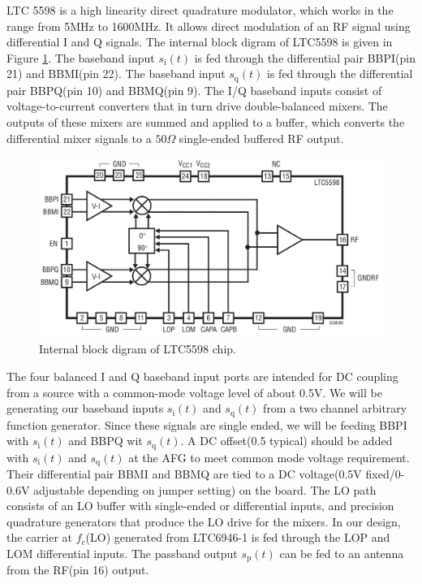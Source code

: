 \documentclass[a4paper,10pt]{article}
\begin{document}
LTC 5598\cite{bib:modchip}
is a high linearity direct quadrature modulator, which works in the range from 5MHz to 1600MHz. 
It allows direct modulation of an RF signal using differential I and Q signals.
The internal block digram of LTC5598 is given in Figure \ref{fig:mod-block}.
The baseband input $s_{\text{i}}(t)$ is fed through the differential pair BBPI(pin 21) and BBMI(pin 22).
The baseband input $s_{\text{q}}(t)$ is fed through the differential pair BBPQ(pin 10) and BBMQ(pin 9).
The I/Q baseband inputs consist of voltage-to-current converters that in turn drive double-balanced mixers.
The outputs of these mixers are summed and applied to a buffer,
which converts the differential mixer signals to a $50\Omega$ single-ended buffered RF output.
\begin{figure}
\centering
\includegraphics[scale=0.4]{figures/ltc5598-block-diagram.jpg}
\caption{Internal block digram of LTC5598 chip. \label{fig:mod-block}}
\end{figure}
The four balanced I and Q baseband input ports are intended for DC coupling from a source with a common-mode voltage level of about 0.5V.
We will be generating our baseband inputs $s_{\text{i}}(t)$ and $s_{\text{q}}(t)$ from a two channel arbitrary function generator.
Since these signals are single ended, we will be feeding BBPI with $s_{\text{i}}(t)$ and BBPQ wit $s_{\text{q}}(t)$.
A DC offset(0.5 typical) should be added with $s_{\text{i}}(t)$ and $s_{\text{q}}(t)$ at the AFG to meet common mode voltage requirement.
Their differential pair BBMI and BBMQ are tied to a DC voltage(0.5V fixed/0-0.6V adjustable depending on jumper setting) on the board.
The LO path consists of an LO buffer with single-ended or differential inputs, and precision
quadrature generators that produce the LO drive for the mixers.
In our design, the carrier at $f_c$(LO) generated from LTC6946-1 is fed through the LOP and LOM differential inputs.
The passband output $s_{\text{p}}(t)$ can be fed to an antenna from the RF(pin 16) output.
\end{document}
